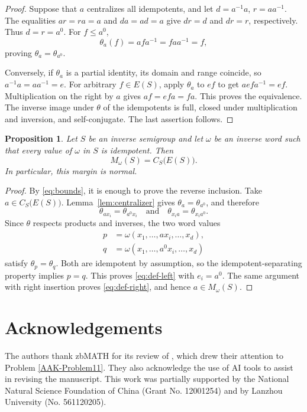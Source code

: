 \documentclass[11pt,a4paper,reqno]{amsart}
\newtheorem{proposition}[theorem]{Proposition}
\newcommand{\E}{E}
\newcommand{\cent}[1]{C_{#1}\bigl(E(#1)\bigr)}
\numberwithin{equation}{section}
\begin{document}
\begin{proof}
Suppose that $a$ centralizes all idempotents, and let $d=a^{-1}a$, $r=aa^{-1}$. The equalities $ar=ra=a$ and $da=ad=a$ give $dr=d$ and $dr=r$, respectively. Thus $d=r=a^0$. For $f\le a^0$,
\[
\theta_a(f)=afa^{-1}=faa^{-1}=f,
\]
proving $\theta_a=\theta_{a^0}$.

Conversely, if $\theta_a$ is a partial identity, its domain and range coincide, so $a^{-1}a=aa^{-1}=e$. For arbitrary $f\in\E(S)$, apply $\theta_a$ to $ef$ to get $aef a^{-1}=ef$. Multiplication on the right by $a$ gives $af=efa=fa$. This proves the equivalence. The inverse image under $\theta$ of the idempotents is full, closed under multiplication and inversion, and self-conjugate. The last assertion follows.
\end{proof}

\begin{proposition}\label{prop:idempotent-values}
Let $S$ be an inverse semigroup and let $\omega$ be an inverse word such that every value of $\omega$ in $S$ is idempotent. Then
$$
M_\omega(S)=\cent S.
$$
In particular, this margin is normal.
\end{proposition}

\begin{proof}
By \eqref{eq:bounds}, it is enough to prove the reverse inclusion. Take $a\in\cent S$. Lemma~\ref{lem:centralizer} gives $\theta_a=\theta_{a^0}$, and therefore
\[
\theta_{ax_i}=\theta_{a^0x_i}
\quad\text{and}\quad
\theta_{x_ia}=\theta_{x_ia^0}.
\]
Since $\theta$ respects products and inverses, the two word values
\[
\begin{aligned}
p&=\omega(x_1,\ldots,ax_i,\ldots,x_d),\\
q&=\omega(x_1,\ldots,a^0x_i,\ldots,x_d)
\end{aligned}
\]
satisfy $\theta_p=\theta_q$. Both are idempotent by assumption, so the idempotent-separating property implies $p=q$. This proves \eqref{eq:def-left} with $e_i=a^0$. The same argument with right insertion proves \eqref{eq:def-right}, and hence $a\in M_\omega(S)$.
\end{proof}


\section*{Acknowledgements}
The authors thank zbMATH for its review of \cite{AAK}, which drew their attention to Problem \ref{AAK-Problem11}. They also acknowledge the use of AI tools to assist in revising the manuscript. This work was partially supported by the National Natural Science Foundation of China (Grant No. 12001254) and by Lanzhou University (No. 561120205). 
\end{document}
